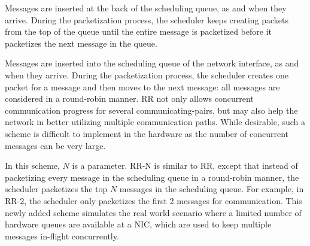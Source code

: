 

\vspace{0.08in}
Messages are inserted
at the back of the scheduling queue, as and when they arrive.
During the packetization process, %
the scheduler keeps creating packets from the top of the queue until
the entire message is packetized before it packetizes the next message in the queue. 

\vspace{0.08in}
 Messages are inserted into the scheduling queue of
the network interface, as and when they arrive. During the packetization process,
the scheduler creates one packet for a message and then moves to the next message:
all messages are considered in a round-robin manner. 
RR not only allows concurrent communication
progress for several communicating-pairs, but may also help the network in
better utilizing multiple communication paths. While desirable, such a scheme is
difficult to implement in the hardware as the number of concurrent messages can
be very large.

\vspace{0.08in}

\vspace{0.08in}
 In this scheme, $N$ is a parameter. RR-N is similar to RR,
except that instead of packetizing every message in the scheduling queue in
a round-robin manner,
the scheduler packetizes the top $N$ messages in the scheduling queue. For example,
in RR-2, the scheduler only packetizes the first 2 messages for communication.
This newly added scheme simulates the real world scenario where a limited
number of hardware queues are available at a NIC, which are used to keep
multiple messages in-flight concurrently.

